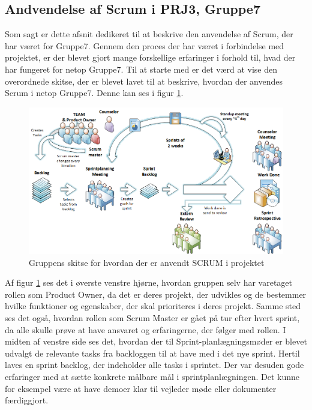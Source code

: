 \documentclass[Rapport/Rapport_main.tex]{subfiles}
\begin{document}
\subsection{Andvendelse af Scrum i PRJ3, Gruppe7}
Som sagt er dette afsnit dedikeret til at beskrive den anvendelse af Scrum, der har været for Gruppe7. Gennem den proces der har været i forbindelse med projektet, er der blevet gjort mange forskellige erfaringer i forhold til, hvad der har fungeret for netop Gruppe7. Til at starte med er det værd at vise den overordnede skitse, der er blevet lavet til at beskrive, hvordan der anvendes Scrum i netop Gruppe7. Denne kan ses i figur \ref{fig:rap_scrum_usage}.
\begin{figure}[H]
    \centering
    \includegraphics[width=\textwidth]{Processdokument/graphics/Scrum_usage.png}
    \caption{Gruppens skitse for hvordan der er anvendt SCRUM i projektet}
    \label{fig:rap_scrum_usage}
\end{figure}
Af figur \ref{fig:rap_scrum_usage} ses det i øverste venstre hjørne, hvordan gruppen selv har varetaget rollen som Product Owner, da det er deres projekt, der udvikles og de bestemmer hvilke funktioner og egenskaber, der skal prioriteres i deres projekt. Samme sted ses det også, hvordan rollen som Scrum Master er gået på tur efter hvert sprint, da alle skulle prøve at have ansvaret og erfaringerne, der følger med rollen. I midten af venstre side ses det, hvordan der til Sprint-planlægningsmøder er blevet udvalgt de relevante tasks fra backloggen til at have med i det nye sprint. Hertil laves en sprint backlog, der indeholder alle tasks i sprintet. Der var desuden gode erfaringer med at sætte konkrete målbare mål i sprintplanlægningen. Det kunne for eksempel være at have demoer klar til vejleder møde eller dokumenter færdiggjort.\\
\end{document}
